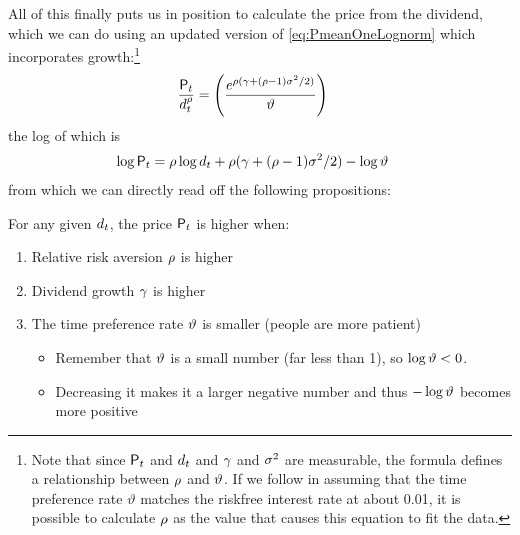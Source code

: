 \documentclass{\handout}
\begin{document}
\hypertarget{PLognormGro}{}
All of this finally puts us in position to calculate the price from the dividend, which we can do using an updated version of \eqref{eq:PmeanOneLognorm} which incorporates growth:\footnote{Note that since $\Price_{t}$ and $\dvdnd_{t}$ and $\pGro$ and $\riskyvar$ are measurable, the formula defines a relationship between $\CRRA$ and $\timeRate$.  If we follow \cite{mehraPrescottPuzzle} in assuming that the time preference rate $\vartheta$ matches the riskfree interest rate at about 0.01, it is possible to calculate $\CRRA$ as the value that causes this equation to fit the data.}
\begin{equation}\begin{gathered}\begin{aligned}\providecommand{\Price}{\mathsf{P}}\providecommand{\CRRA}{\rho}\providecommand{\dvdnd}{d}\providecommand{\pGro}{\gamma}\providecommand{\riskyvar}{\sigma^{2}}\providecommand{\timeRate}{\vartheta}
  \frac{\Price_{t}}{\dvdnd_{t}^{\CRRA}} 
 & =  \left(\frac{e^{\CRRA(\pGro+(\CRRA-1)\riskyvar/2)}}{\timeRate}\right)\label{eq:PLognormGro}
\end{aligned}\end{gathered}\end{equation}
the log of which is\hypertarget{logprice}{}
\begin{equation}\begin{gathered}\begin{aligned}\providecommand{\Price}{\mathsf{P}}\providecommand{\CRRA}{\rho}\providecommand{\dvdnd}{d}\providecommand{\pGro}{\gamma}\providecommand{\riskyvar}{\sigma^{2}}\providecommand{\timeRate}{\vartheta}
  \log \Price_{t} & =  \CRRA \log \dvdnd_{t} + \CRRA(\pGro+(\CRRA-1)\riskyvar/2)- \log \timeRate 
\end{aligned}\end{gathered}\end{equation}
from which we can directly read off the following propositions:
\medskip

\noindent For any given $\dvdnd_{t}$, the price $\Price_{t}$ is higher when:
\begin{enumerate}
\item Relative risk aversion $\CRRA$ is higher
\item Dividend growth $\pGro$ is higher
\item The time preference rate $\timeRate$ is smaller (people are more patient)
  \begin{itemize}
  \item Remember that $\timeRate$ is a small number (far less than 1), so $\log \timeRate < 0$.
    \item Decreasing it makes it a larger negative number and thus $-\log \timeRate$ becomes more positive
    \end{itemize}
\end{enumerate}
\end{document}
